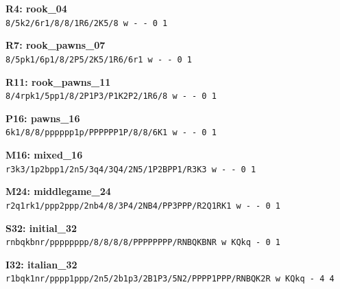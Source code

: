 \begingroup\footnotesize
\textbf{R4: rook\_04}\\
\texttt{8/5k2/6r1/8/8/1R6/2K5/8 w - - 0 1}\par\smallskip
\textbf{R7: rook\_pawns\_07}\\
\texttt{8/5pk1/6p1/8/2P5/2K5/1R6/6r1 w - - 0 1}\par\smallskip
\textbf{R11: rook\_pawns\_11}\\
\texttt{8/4rpk1/5pp1/8/2P1P3/P1K2P2/1R6/8 w - - 0 1}\par\smallskip
\textbf{P16: pawns\_16}\\
\texttt{6k1/8/8/pppppp1p/PPPPPP1P/8/8/6K1 w - - 0 1}\par\smallskip
\textbf{M16: mixed\_16}\\
\texttt{r3k3/1p2bpp1/2n5/3q4/3Q4/2N5/1P2BPP1/R3K3 w - - 0 1}\par\smallskip
\textbf{M24: middlegame\_24}\\
\texttt{r2q1rk1/ppp2ppp/2nb4/8/3P4/2NB4/PP3PPP/R2Q1RK1 w - - 0 1}\par\smallskip
\textbf{S32: initial\_32}\\
\texttt{rnbqkbnr/pppppppp/8/8/8/8/PPPPPPPP/RNBQKBNR w KQkq - 0 1}\par\smallskip
\textbf{I32: italian\_32}\\
\texttt{r1bqk1nr/pppp1ppp/2n5/2b1p3/2B1P3/5N2/PPPP1PPP/RNBQK2R w KQkq - 4 4}\par\smallskip
\endgroup
